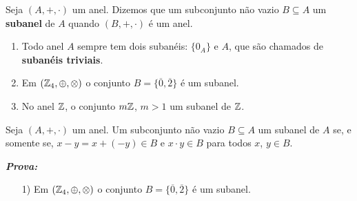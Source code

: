 \documentclass{beamer}
\begin{document}
    \begin{frame}
        \begin{definicao}
            Seja $(A, +, \cdot)$ um anel. \pause Dizemos que um subconjunto n{\~a}o vazio \pause $B\subseteq A$  um \textbf{subanel} de $A$ \pause quando $(B, +, \cdot)$ \'e um anel.\pause
        \end{definicao}

        \begin{exemplos}
            \begin{enumerate}[label={\arabic*})]
                \item Todo anel $A$ sempre tem dois suban{\'e}is: \pause $\{0_{A}\}$ \pause e $A$, \pause que s{\~a}o chamados de \textbf{suban{\'e}is triviais}.\pause

                \vspace{.5cm}

                \item Em $(\mathbb{Z}_4,\oplus,\otimes)$ \pause o conjunto $B = \{\overline{0}, \overline{2}\}$ \'e um subanel.\pause

                \vspace{.5cm}
                
                \item No anel $\mathbb{Z}$, \pause o conjunto $m\mathbb{Z}$, $m > 1$  um subanel de $\mathbb{Z}$.\pause

                \vspace{.5cm}
            \end{enumerate} 
        \end{exemplos}
    \end{frame}

    \begin{frame}
        \begin{proposicao}
            Seja $(A, +,\cdot)$ um anel. \pause Um subconjunto n{\~a}o vazio \pause $B\subseteq A$  um subanel de $A$ \pause se, e somente se, \pause $x - y = x + (-y) \in B$ \pause e $x\cdot y \in B$ \pause para todos $x$, $y \in B$.\pause
        \end{proposicao}

        \noindent \textbf{\textit{Prova: }}\pause
    \end{frame}

    \begin{frame}
        \begin{exemplos}
            \begin{enumerate}
                \item[1)] Em $(\mathbb{Z}_4,\oplus,\otimes)$ \pause o conjunto $B = \{\overline{0}, \overline{2}\}$ \'e um subanel.\pause

                \vspace{5cm}
            \end{enumerate}
        \end{exemplos}
    \end{frame}
\end{document}
